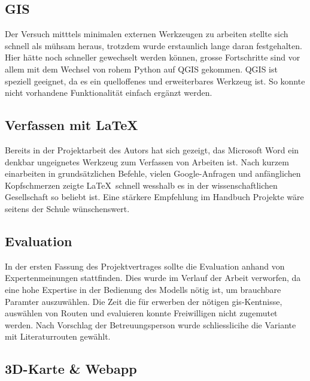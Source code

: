 \subsection{GIS}

Der Versuch mitttels minimalen externen Werkzeugen zu arbeiten stellte sich schnell als mühsam heraus, trotzdem wurde erstaunlich lange daran festgehalten. Hier hätte noch schneller gewechselt werden können, grosse Fortschritte sind vor allem mit dem Wechsel von rohem Python auf QGIS gekommen. QGIS ist speziell geeignet, da es ein quelloffenes und erweiterbares Werkzeug ist. So konnte nicht vorhandene Funktionalität einfach ergänzt werden.

\subsection{Verfassen mit \LaTeX}
Bereits in der Projektarbeit des Autors hat sich gezeigt, das Microsoft Word ein denkbar ungeignetes Werkzeug zum Verfassen von Arbeiten ist. Nach kurzem einarbeiten in grundsätzlichen Befehle, vielen Google-Anfragen und anfänglichen Kopfschmerzen zeigte \LaTeX\ schnell wesshalb es in der wissenschaftlichen Gesellschaft so beliebt ist. Eine stärkere Empfehlung im Handbuch Projekte wäre seitens der Schule wünschenswert.

\subsection{Evaluation}

In der ersten Fassung des Projektvertrages sollte die Evaluation anhand von Expertenmeinungen stattfinden. Dies wurde im  Verlauf der Arbeit verworfen, da eine hohe Expertise in der Bedienung des Modells nötig ist, um brauchbare Paramter auszuwählen. Die Zeit die für erwerben der nötigen \gls{gis}-Kentnisse, auswählen von Routen und evaluieren konnte Freiwilligen nicht zugemutet werden. Nach Vorschlag der Betreuungsperson wurde schliesslicihe die Variante mit Literaturrouten gewählt.

\subsection{3D-Karte \& Webapp}

